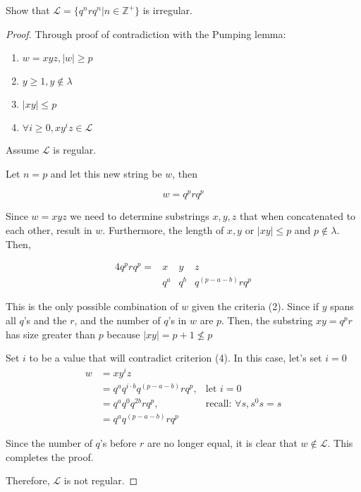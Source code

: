 \begin{ex}
    Show that $\mathcal{L}=\{q^nrq^n|n\in\mathbb{Z^+}\}$ is irregular.
\end{ex}

\begin{proof}
    Through proof of contradiction with the Pumping lemma: 
    \begin{enumerate}
        \item $w=xyz, |w| \geq p$
        \item $y\geq 1, y\notin\lambda$
        \item $|xy|\leq p$
        \item $\forall i\geq 0, xy^iz\in\mathcal{L}$
    \end{enumerate}
    
    Assume $\mathcal{L}$ is regular.
    
    Let $n = p$ and let this new string be $w$, then
    
    \[
    w = q^p r q^p
    \]
    
    Since $w=xyz$ we need to determine substrings $x,y,z$ that when concatenated to each other, result in $w$. Furthermore, the length of $x,y$ or $|xy|\leq p$ and $p\notin \lambda$. Then,
    
   \begin{alignat*}{4}
        q^prq^p = & x  & y  & z \\
                  & q^a & q^b &q^{(p-a-b)} r q^p
    \end{alignat*}
    
    This is the only possible combination of $w$ given the criteria (2). Since if $y$ spans all $q$'s and the $r$, and the number of $q$'s in $w$ are $p$. Then, the substring $xy=q^pr$ has size greater than $p$ because $|xy| =p+1\nleq p$
    
    Set $i$ to be a value that will contradict criterion (4). In this case, let's set $i=0$
    \begin{align*}
        w & = xy^iz \\
          & = q^aq^{i\cdot b}q^{(p-a-b)}rq^p,& \text{let } i = 0 \\
          & = q^aq^{0}q^{2b}rq^p,& \text{recall: } \forall s,s^0s = s \\
          & = q^a q^{(p-a-b)}rq^p
    \end{align*}
    
Since the number of $q$'s before $r$ are no longer equal, it is clear that $w\notin \mathcal{L}$. This completes the proof.
    
    Therefore, $\mathcal{L}$ is not regular.
\end{proof}

